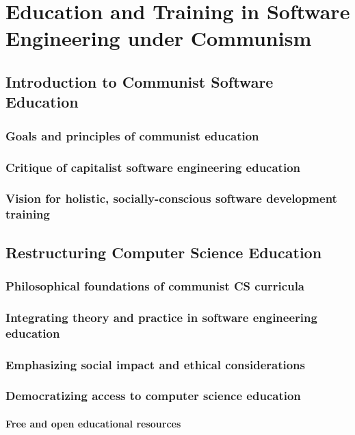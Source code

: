 \chapter{Education and Training in Software Engineering under Communism}

\section{Introduction to Communist Software Education}
\subsection{Goals and principles of communist education}
\subsection{Critique of capitalist software engineering education}
\subsection{Vision for holistic, socially-conscious software development training}

\newpage

\section{Restructuring Computer Science Education}
\subsection{Philosophical foundations of communist CS curricula}
\subsection{Integrating theory and practice in software engineering education}
\subsection{Emphasizing social impact and ethical considerations}
\subsection{Democratizing access to computer science education}
\subsubsection{Free and open educational resources}
